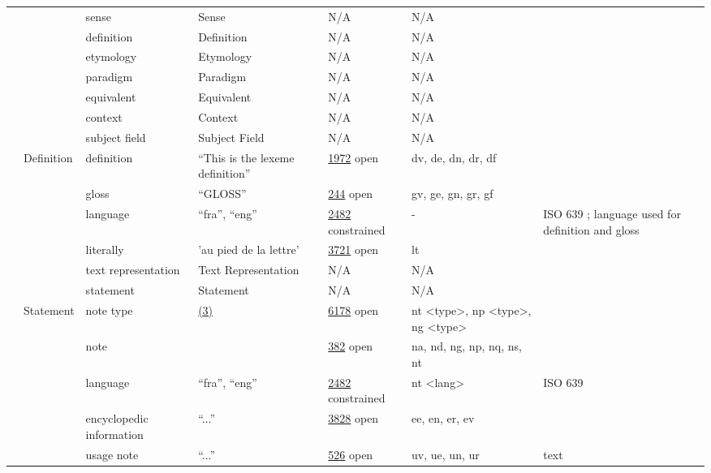\documentclass[a4paper,12pt]{article}
\begin{document}
\begin{center}
\begin{longtable}{*7{p{2cm}}}
& & sense & Sense & N/A & N/A & \\ \cmidrule{3-7}
& & definition & Definition & N/A & N/A & \\ \cmidrule{3-7}
& & etymology & Etymology & N/A & N/A & \\ \cmidrule{3-7}
& & paradigm & Paradigm & N/A & N/A & \\ \cmidrule{3-7}
& & equivalent & Equivalent & N/A & N/A & \\ \cmidrule{3-7}
& & context & Context & N/A & N/A & \\ \cmidrule{3-7}
& & subject field & Subject Field & N/A & N/A & \\ \cmidrule{2-7}
& \multirow{6}{2cm}{Definition} & definition & ``This is the lexeme definition'' & \href{http://www.isocat.org/datcat/DC-1972}{1972} open & dv, de, dn, dr, df & \\ \cmidrule{3-7}
& & gloss & ``\scshape{GLOSS}'' & \href{http://www.isocat.org/datcat/DC-244}{244} open & gv, ge, gn, gr, gf & \\ \cmidrule{3-7}
& & language & ``fra'', ``eng'' & \href{http://www.isocat.org/datcat/DC-2482}{2482} constrained & - & ISO 639 ; language used for definition and gloss \\ \cmidrule{3-7}
& & literally & 'au pied de la lettre' & \href{http://www.isocat.org/datcat/DC-3721}{3721} open & lt & \\ \cmidrule{3-7}
& & text representation & Text Re\-pre\-sen\-ta\-tion & N/A & N/A & \\ \cmidrule{3-7}
& & statement & Statement & N/A & N/A & \\ \cmidrule{2-7}
& \multirow{8}{2cm}{Statement} & note type & \hyperlink{3}{(3)} \hypertarget{nt}{} & \href{http://www.isocat.org/datcat/DC-6178}{6178} open & nt \textless type\textgreater, np \textless type\textgreater, ng \textless type\textgreater & \\ \cmidrule{3-7}
& & note & & \href{http://www.isocat.org/datcat/DC-382}{382} open & na, nd, ng, np, nq, ns, nt & \\ \cmidrule{3-7}
& & language & ``fra'', ``eng'' & \href{http://www.isocat.org/datcat/DC-2482}{2482} constrained & nt \textless lang\textgreater & ISO 639 \\ \cmidrule{3-7}
& & encyclopedic information & ``...'' & \href{http://www.isocat.org/datcat/DC-3828}{3828} open & ee, en, er, ev & \\ \cmidrule{3-7}
& & usage note & ``...'' & \href{http://www.isocat.org/datcat/DC-526}{526} open & uv, ue, un, ur & text \\ \cmidrule{3-7}

\end{longtable}
\end{center}
\end{document}
